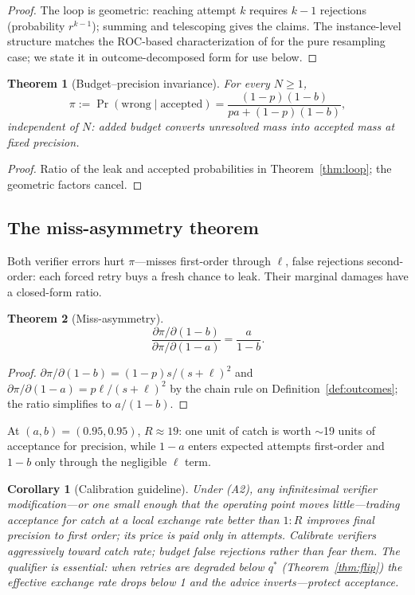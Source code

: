 \documentclass[10pt]{article}
\newtheorem{theorem}{Theorem}
\newtheorem{corollary}{Corollary}
\begin{document}
\begin{proof}
The loop is geometric: reaching attempt $k$ requires $k-1$
rejections (probability $r^{k-1}$); summing and telescoping gives
the claims.  The instance-level structure matches the ROC-based
characterization of \citet{dorner2026rocnreroll} for the pure
resampling case; we state it in outcome-decomposed form for use
below.
\end{proof}

\begin{theorem}[Budget--precision invariance]\label{thm:invariance}
For every $N\ge1$,
\[
\pi := \Pr(\text{wrong} \mid \text{accepted})
= \frac{(1-p)(1-b)}{pa + (1-p)(1-b)},
\]
independent of $N$: added budget converts unresolved mass into
accepted mass \emph{at fixed precision}.
\end{theorem}

\begin{proof}
Ratio of the leak and accepted probabilities in
Theorem~\ref{thm:loop}; the geometric factors cancel.
\end{proof}

\subsection{The miss-asymmetry theorem}\label{sec:asym}

Both verifier errors hurt $\pi$---misses first-order through $\ell$,
false rejections second-order: each forced retry buys a fresh chance
to leak.  Their marginal damages have a closed-form ratio.

\begin{theorem}[Miss-asymmetry]\label{thm:asym}
\[
\frac{\partial \pi / \partial (1-b)}{\partial \pi / \partial (1-a)}
= \frac{a}{1-b}.
\]
\end{theorem}

\begin{proof}
$\partial\pi/\partial(1-b) = (1-p)s/(s+\ell)^2$ and
$\partial\pi/\partial(1-a) = p\ell/(s+\ell)^2$ by the chain rule on
Definition~\ref{def:outcomes}; the ratio simplifies to $a/(1-b)$.
\end{proof}

At $(a,b)=(0.95,0.95)$, $R \approx 19$: one unit of catch is
worth $\sim$19 units of acceptance for precision, while $1-a$
enters expected attempts first-order and $1-b$ only through the
negligible $\ell$ term.

\begin{corollary}[Calibration guideline]\label{cor:calibrate}
Under (A2), any infinitesimal verifier modification---or one small
enough that the operating point moves little---trading acceptance
for catch at a local exchange rate better than $1{:}R$ improves
final precision to first order; its price is paid only in
attempts.  Calibrate verifiers
aggressively toward catch rate; budget false rejections rather than
fear them.  The qualifier is essential: when retries are degraded
below $q^\ast$ (Theorem~\ref{thm:flip}) the effective exchange rate
drops below 1 and the advice inverts---protect acceptance.
\end{corollary}
\end{document}
